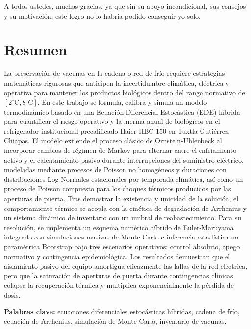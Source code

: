 \documentclass[
  spanish,
  us-letterpaper,
]{scrreprt}
\numberwithin{equation}{section}
\renewcommand*\contentsname{Tabla de contenidos}
\newcommand\contentsname{Tabla de contenidos}
\theoremstyle{plain}
\theoremstyle{plain}
\theoremstyle{plain}
\theoremstyle{definition}
\theoremstyle{remark}
\begin{document}
A todos ustedes, muchas gracias, ya que sin su apoyo incondicional, sus consejos y su motivación, este logro no lo habría podido conseguir yo solo.
\renewcommand*\contentsname{Tabla de contenidos}
{
\hypersetup{linkcolor=}
\setcounter{tocdepth}{2}
\tableofcontents
}


\chapter{Resumen}\label{resumen}

La preservación de vacunas en la cadena o red de frío requiere
estrategias matemáticas rigurosas que anticipen la incertidumbre
climática, eléctrica y operativa para mantener los productos biológicos
dentro del rango normativo de \([2^\circ\text{C}, 8^\circ\text{C}]\). En
este trabajo se formula, calibra y simula un modelo termodinámico basado
en una Ecuación Diferencial Estocástica (EDE) híbrida para cuantificar
el riesgo operativo y la merma anual de biológicos en el refrigerador
institucional precalificado Haier HBC-150 en Tuxtla Gutiérrez, Chiapas.
El modelo extiende el proceso clásico de Ornstein-Uhlenbeck al
incorporar cambios de régimen de Markov para alternar entre el
enfriamiento activo y el calentamiento pasivo durante interrupciones del
suministro eléctrico, modeladas mediante procesos de Poisson no
homogéneos y duraciones con distribuciones Log-Normales estacionales por
temporada climática, así como un proceso de Poisson compuesto para los
choques térmicos producidos por las aperturas de puerta. Tras demostrar
la existencia y unicidad de la solución, el comportamiento térmico se
acopla con la cinética de degradación de Arrhenius y un sistema dinámico
de inventario con un umbral de reabastecimiento. Para su resolución, se
implementa un esquema numérico híbrido de Euler-Maruyama integrado con
simulaciones masivas de Monte Carlo e inferencia estadística no
paramétrica Bootstrap bajo tres escenarios operativos: control absoluto,
apego normativo y contingencia epidemiológica. Los resultados demuestran
que el aislamiento pasivo del equipo amortigua eficazmente las fallas de
la red eléctrica, pero que la saturación de aperturas de puerta durante
contingencias clínicas colapsa la recuperación térmica y multiplica
exponencialmente la pérdida de dosis.

\textbf{Palabras clave:} ecuaciones diferenciales estocásticas híbridas,
cadena de frío, ecuación de Arrhenius, simulación de Monte Carlo,
inventario de vacunas.
\end{document}
